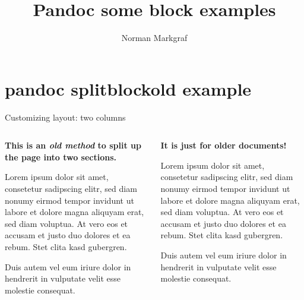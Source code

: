 \documentclass[10pt,english,ignorenonframetext,]{beamer}
\title{Pandoc some block examples}
\author{Norman Markgraf}
\date{}
\begin{document}
\frame{\titlepage}

\section{pandoc splitblockold
example}\label{pandoc-splitblockold-example}

\begin{frame}{Customizing layout: two columns}

\begin{columns}[T]
	\begin{column}[t]{0.485\textwidth}

\textbf{This is an \emph{old method} to split up the page into two
sections.}

Lorem ipsum dolor sit amet, consetetur sadipscing elitr, sed diam nonumy
eirmod tempor invidunt ut labore et dolore magna aliquyam erat, sed diam
voluptua. At vero eos et accusam et justo duo dolores et ea rebum. Stet
clita kasd gubergren.

Duis autem vel eum iriure dolor in hendrerit in vulputate velit esse
molestie consequat.

	\end{column}
	\begin{column}[t]{0.485\textwidth}

\textbf{It is just for older documents!}

Lorem ipsum dolor sit amet, consetetur sadipscing elitr, sed diam nonumy
eirmod tempor invidunt ut labore et dolore magna aliquyam erat, sed diam
voluptua. At vero eos et accusam et justo duo dolores et ea rebum. Stet
clita kasd gubergren.

Duis autem vel eum iriure dolor in hendrerit in vulputate velit esse
molestie consequat.

	\end{column}
\end{columns}

\end{frame}
\end{document}
